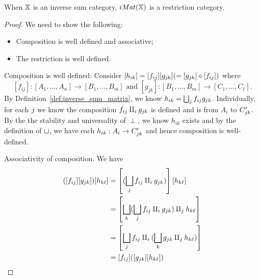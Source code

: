 \begin{lemma}\label{lem:inverse_matrix_category_is_a_restriction_category}
  When $\mathbb{X}$ is an inverse sum category, $iMat(\mathbb{X})$ is a restriction category.
\end{lemma}
\begin{proof}
  We need to show the following:
  \begin{itemize}
    \item Composition is well defined and associative;
    \item The restriction is well defined.
  \end{itemize}
  Composition is well defined: Consider $[h_{i k}] = [f_{i j}] [g_{j k}] (= [g_{j k}] \diamond
  [f_{ij}])$ where
  \[
    [f_{i j}]: [A_1,\ldots, A_n] \to [B_1,\ldots, B_m] \text{ and }
    [g_{j k}]: [B_1,\ldots, B_m] \to [C_1,\ldots, C_\ell].
  \]
  By Definition~\ref{def:inverse_sum_matrix}, we know $h_{i k} = \bigsqcup_j f_{i j} g_{j
  k}$. Individually, for each $j$ we know the composition $f_{i j}\amalg_{i} g_{j k}$ is
  defined and is from $A_i$ to $C'_{j k}$. By the the stability and universality of $\perp$, we
  know $h_{i k}$ exists and by the definition of $\sqcup$, we have each $h_{i k}: A_i \to C'_{j
  k}$ and hence composition is well-defined.

  Associativity of composition. We have
  \begin{align*}
    ([f_{i j}] [g_{j k}]) [h_{k \ell}]
        &= \left[(\bigsqcup_j f_{i j} \amalg_{i} g_{j k})\right] [h_{k \ell}]\\
        &=\left[ \bigsqcup_k (\bigsqcup_j f_{i j} \amalg_{i} g_{j k}) \amalg_{j} h_{k \ell}\right]\\
        &=\left[ \bigsqcup_j f_{i j} \amalg_{i} (\bigsqcup_k g_{j k}\amalg_{j} h_{k \ell})\right]\\
        &=[ f_{i j} ]  ([g_{j k}] [h_{k \ell}])
  \end{align*}


\end{proof}
